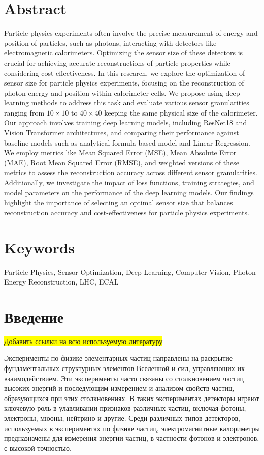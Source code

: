 \documentclass[a4paper,12pt]{extarticle}
\begin{document}
\section*{Abstract}   %
Particle physics experiments often involve the precise measurement of energy and position of particles, such as photons, interacting with detectors like electromagnetic calorimeters. Optimizing the sensor size of these detectors is crucial for achieving accurate reconstructions of particle properties while considering cost-effectiveness. In this research, we explore the optimization of sensor size for particle physics experiments, focusing on the reconstruction of photon energy and position within calorimeter cells. We propose using deep learning methods to address this task and evaluate various sensor granularities ranging from $10 \times 10$ to $40 \times 40$ keeping the same physical size of the calorimeter. Our approach involves training deep learning models, including ResNet18 and Vision Transformer architectures, and comparing their performance against baseline models such as analytical formula-based model and Linear Regression. We employ metrics like Mean Squared Error (MSE), Mean Absolute Error (MAE), Root Mean Squared Error (RMSE), and weighted versions of these metrics to assess the reconstruction accuracy across different sensor granularities. Additionally, we investigate the impact of loss functions, training strategies, and model parameters on the performance of the deep learning models. Our findings highlight the importance of selecting an optimal sensor size that balances reconstruction accuracy and cost-effectiveness for particle physics experiments.


\section*{Keywords}
Particle Physics, Sensor Optimization, Deep Learning, Computer Vision, Photon Energy Reconstruction, LHC, ECAL

\pagebreak

\section{Введение}
\label{section:introduction}

\colorbox{yellow}{Добавить ссылки на всю используемую литературу}

Эксперименты по физике элементарных частиц направлены на раскрытие фундаментальных структурных элементов Вселенной и сил, управляющих их взаимодействием. Эти эксперименты часто связаны со столкновением частиц высоких энергий и последующим измерением и анализом свойств частиц, образующихся при этих столкновениях. В таких экспериментах детекторы играют ключевую роль в улавливании признаков различных частиц, включая фотоны, электроны, мюоны, нейтрино и другие. Среди различных типов детекторов, используемых в экспериментах по физике частиц, электромагнитные калориметры предназначены для измерения энергии частиц, в частности фотонов и электронов, с высокой точностью.
\end{document}
